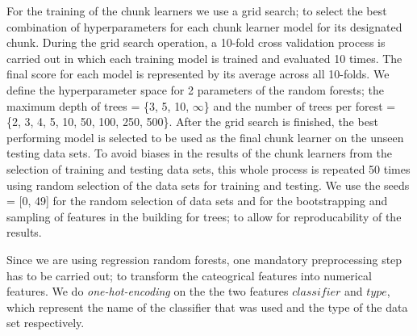 For the training of the chunk learners we use a grid search; to select the best combination of hyperparameters for each chunk learner model for its designated chunk.
During the grid search operation, a 10-fold cross validation process is carried out in which each training model is trained and evaluated 10 times.
The final score for each model is represented by its average across all 10-folds.
We define the hyperparameter space for 2 parameters of the random forests; the maximum depth of trees = \{3, 5, 10, $\infty$\} and the number of trees per forest = \{2, 3, 4, 5, 10, 50, 100, 250, 500\}.
After the grid search is finished, the best performing model is selected to be used as the final chunk learner on the unseen testing data sets.
To avoid biases in the results of the chunk learners from the selection of training and testing data sets, this whole process is repeated 50 times using random selection of the data sets for training and testing.
We use the seeds = [0, 49] for the random selection of data sets and for the bootstrapping and sampling of features in the building for trees; to allow for reproducability of the results.

Since we are using regression random forests, one mandatory preprocessing step has to be carried out; to transform the cateogrical features into numerical features.
We do \emph{one-hot-encoding} on the the two features $classifier$ and $type$, which represent the name of the classifier that was used and the type of the data set respectively.

